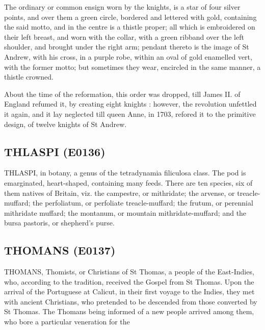 \documentclass{article}
\begin{document}
The ordinary or common ensign worn by the knights, is a star of four silver points, and over them a green circle, bordered and lettered with gold, containing the said motto, and in the centre is a thistle proper; all which is embroidered on their left breast, and worn with the collar, with a green ribband over the left shoulder, and brought under the right arm; pendant thereto is the image of St Andrew, with his cross, in a purple robe, within an oval of gold enamelled vert, with the former motto; but sometimes they wear, encircled in the same manner, a thistle crowned.

About the time of the reformation, this order was dropped, till James II. of England refumed it, by creating eight knights : however, the revolution unfettled it again, and it lay neglected till queen Anne, in 1703, refored it to the primitive design, of twelve knights of St Andrew.

\subsection*{THLASPI (E0136)}
THLASPI, in botany, a genus of the tetradynamia filiculosa class. The pod is emarginated, heart-shaped, containing many feeds. There are ten species, six of them natives of Britain, viz. the campestre, or mithridate; the arvense, or treacle-muffard; the perfoliatum, or perfoliate treacle-muffard; the frutum, or perennial mithridate muffard; the montanum, or mountain mithridate-muffard; and the bursa pastoris, or shepherd's purse.

\subsection*{THOMANS (E0137)}
THOMANS, Thomists, or Christians of St Thomas, a people of the East-Indies, who, according to the tradition, received the Gospel from St Thomas. Upon the arrival of the Portuguese at Calicut, in their first voyage to the Indies, they met with ancient Christians, who pretended to be descended from those converted by St Thomas. The Thomans being informed of a new people arrived among them, who bore a particular veneration for the
\end{document}
